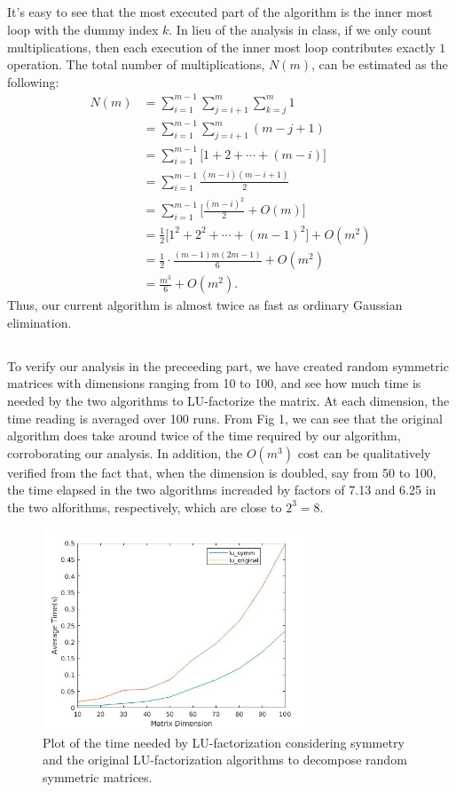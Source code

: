 \documentclass[11pt]{article}
\begin{document}
\subsection{}
It's easy to see that the most executed part of the algorithm is the inner most loop with the dummy index $k$. In lieu of the analysis in class, if we only count multiplications, then each execution of the inner most loop contributes exactly $1$ operation. The total number of multiplications, $N(m)$, can be estimated as the following:
\begin{equation}\begin{split} 
N(m) &= \sum_{i=1}^{m-1} \sum_{j=i+1}^m \sum_{k=j}^m 1\\
&= \sum_{i=1}^{m-1} \sum_{j=i+1}^m (m - j + 1) \\
&= \sum_{i=1}^{m-1} \Big[ 1 + 2 + \cdots + (m-i) \Big] \\
&= \sum_{i=1}^{m-1} \frac{(m-i)(m-i+1)}2 \\
&= \sum_{i=1}^{m-1} \Big[ \frac{(m-i)^2}2 + O(m) \Big]\\
&= \frac12\Big[ 1^2 + 2^2 + \cdots + (m-1)^2 \Big] + O(m^2) \\
&= \frac12\cdot \frac{(m-1)m(2m-1)}6 + O(m^2)\\
&=\frac{m^3}6 + O(m^2).
\end{split}\nonumber\end{equation} 
Thus, our current algorithm is almost twice as fast as ordinary Gaussian elimination.

\subsection{}
To verify our analysis in the preceeding part, we have created random symmetric matrices with dimensions ranging from 10 to 100, and see how much time is needed by the two algorithms to LU-factorize the matrix. At each dimension, the time reading is averaged over 100 runs. From Fig 1, we can see that the original algorithm does take around twice of the time required by our algorithm, corroborating our analysis. In addition, the $O(m^3)$ cost can be qualitatively verified from the fact that, when the dimension is doubled, say from 50 to 100, the time elapsed in the two algorithms increaded by factors of 7.13 and 6.25 in the two alforithms, respectively, which are close to $2^3 = 8$.
\begin{figure}[t]
\includegraphics[width=8cm]{matlab/prob1d.jpg}
\centering
\caption{Plot of the time needed by LU-factorization considering symmetry and the original LU-factorization algorithms to decompose random symmetric matrices.}
\end{figure} 
\end{document}

